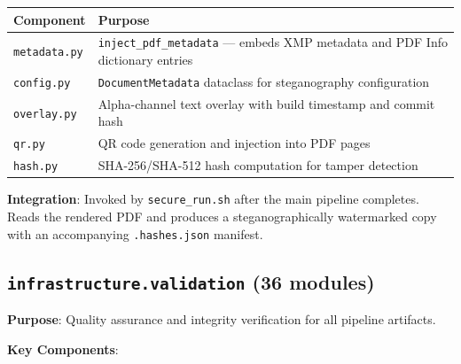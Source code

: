 \documentclass[
]{article}
\newcounter{none} %
\begin{document}
{\def\LTcaptype{none} %
\begin{longtable}[]{@{}
  >{\raggedright\arraybackslash}p{}
  >{\raggedright\arraybackslash}p{}@{}}
\toprule\noalign{}
\begin{minipage}[b]{\linewidth}\raggedright
Component
\end{minipage} & \begin{minipage}[b]{\linewidth}\raggedright
Purpose
\end{minipage} \\
\midrule\noalign{}
\endhead
\bottomrule\noalign{}
\endlastfoot
\texttt{metadata.py} & \texttt{inject\_pdf\_metadata} --- embeds XMP
metadata and PDF Info dictionary entries \\
\texttt{config.py} & \texttt{DocumentMetadata} dataclass for
steganography configuration \\
\texttt{overlay.py} & Alpha-channel text overlay with build timestamp
and commit hash \\
\texttt{qr.py} & QR code generation and injection into PDF pages \\
\texttt{hash.py} & SHA-256/SHA-512 hash computation for tamper
detection \\
\end{longtable}
}

\textbf{Integration}: Invoked by \texttt{secure\_run.sh} after the main
pipeline completes. Reads the rendered PDF and produces a
steganographically watermarked copy with an accompanying
\texttt{.hashes.json} manifest.

\subsection{\texorpdfstring{\texttt{infrastructure.validation} (36
modules)}{infrastructure.validation (36 modules)}}\label{infrastructure.validation-36-modules}

\textbf{Purpose}: Quality assurance and integrity verification for all
pipeline artifacts.

\textbf{Key Components}:
\end{document}
